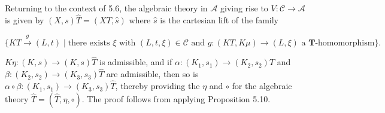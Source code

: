 Returning to the context of 5.6, the algebraic theory in $\mathcal{A}$ giving rise to $V: \mathcal{C} \longrightarrow \mathcal{A}$ is given by $(X, s)\hat{T} = (XT, \hat{s})$ where $\hat{s}$ is the cartesian lift of the family

$$\{KT \xrightarrow{g} (L, t) \mid \text{there exists } \xi \text{ with } (L, t, \xi) \in \mathcal{C} \text{ and } g: (KT, K\mu) \longrightarrow (L, \xi) \text{ a } \mathbf{T}\text{-homomorphism}\}.$$

$K\eta: (K, s) \longrightarrow (K, s)\hat{T}$ is admissible, and if $\alpha: (K_1, s_1) \longrightarrow (K_2, s_2)\hat{T}$ and $\beta: (K_2, s_2) \longrightarrow (K_3, s_3)\hat{T}$ are admissible, then so is $\alpha \circ \beta: (K_1, s_1) \longrightarrow (K_3, s_3)\hat{T}$, thereby providing the $\eta$ and $\circ$ for the algebraic theory $\hat{T} = (\hat{T}, \eta, \circ)$. The proof follows from applying Proposition 5.10.
